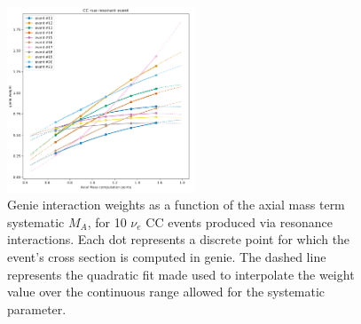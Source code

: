 \begin{figure}
    \centering
    \includegraphics[width=0.5\textwidth]{figures/measurement/systematics/xsec/nue_cc_res_xsec_Ma_systematic.png}
    \caption{Genie interaction weights as a function of the axial mass term systematic $M_{A}$, for 10 $\nu_{e}$ CC events produced via resonance interactions. Each dot represents a discrete point for which the event's cross section is computed in genie. The dashed line represents the quadratic fit made used to interpolate the weight value over the continuous range allowed for the systematic parameter.}
    \label{xsec:resonant_mass}
\end{figure}

